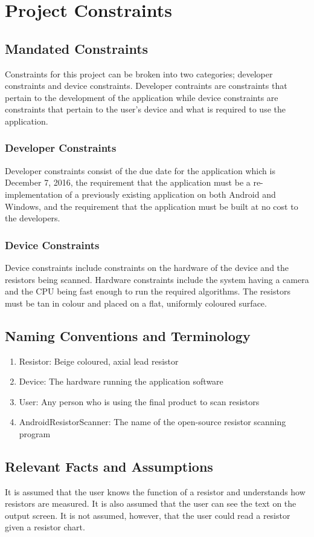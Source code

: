 \documentclass{article}
\begin{document}
\section{Project Constraints}

\subsection{Mandated Constraints}
Constraints for this project can be broken into two categories; developer constraints and device constraints. Developer contraints are constraints that pertain to the development of the application while device constraints are constraints that pertain to the user's device and what is required to use the application. 
\subsubsection{Developer Constraints}
Developer constraints consist of the due date for the application which is December 7, 2016, the requirement that the application must be a re-implementation of a previously existing application on both Android and Windows, and the requirement that the application must be built at no cost to the developers.
\subsubsection{Device Constraints}
Device constraints include constraints on the hardware of the device and the resistors being scanned. Hardware constraints include the system having a camera and the CPU being fast enough to run the required algorithms. The resistors must be tan in colour and placed on a  flat, uniformly coloured surface.

\subsection{Naming Conventions and Terminology }
\begin{enumerate}
\item Resistor: Beige coloured, axial lead resistor
\item Device: The hardware running the application software
\item User: Any person who is using the final product to scan resistors
\item AndroidResistorScanner: The name of the open-source resistor scanning program
\end{enumerate}


\subsection{Relevant Facts and Assumptions}
It is assumed that the user knows the function of a resistor and understands how resistors are measured. It is also assumed that the user can see the text on the output screen. It is not assumed, however, that the user could read a resistor given a resistor chart.
\end{document}

